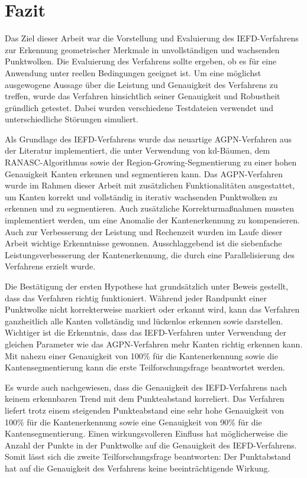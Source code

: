 \chapter{Fazit}

Das Ziel dieser Arbeit war die Vorstellung und Evaluierung des IEFD-Verfahrens zur Erkennung geometrischer Merkmale in unvollständigen und wachsenden Punktwolken. Die Evaluierung des Verfahrens sollte ergeben, ob es für eine Anwendung unter reellen Bedingungen geeignet ist. Um eine möglichst ausgewogene Aussage über die Leistung und Genauigkeit des Verfahrens zu treffen, wurde das Verfahren hinsichtlich seiner Genauigkeit und Robustheit gründlich getestet. Dabei wurden verschiedene Testdateien verwendet und unterschiedliche Störungen simuliert. 

Als Grundlage des IEFD-Verfahrens wurde das neuartige AGPN-Verfahren aus der Literatur implementiert, die unter Verwendung von kd-Bäumen, dem RANASC-Algorithmus sowie der Region-Growing-Segmentierung zu einer hohen Genauigkeit Kanten erkennen und segmentieren kann. Das AGPN-Verfahren wurde im Rahmen dieser Arbeit mit zusätzlichen Funktionalitäten ausgestattet, um Kanten korrekt und vollständig in iterativ wachsenden Punktwolken zu erkennen und zu segmentieren. Auch zusätzliche Korrekturmaßnahmen mussten implementiert werden, um eine Anomalie der Kantenerkennung zu kompensieren. Auch zur Verbesserung der Leistung und Rechenzeit wurden im Laufe dieser Arbeit wichtige Erkenntnisse gewonnen. Ausschlaggebend ist die siebenfache Leistungsverbesserung der Kantenerkennung, die durch eine Parallelisierung des Verfahrens erzielt wurde.

Die Bestätigung der ersten Hypothese hat grundsätzlich unter Beweis gestellt, dass das Verfahren richtig funktioniert. Während jeder Randpunkt einer Punktwolke nicht korrekterweise markiert oder erkannt wird, kann das Verfahren ganzheitlich alle Kanten vollständig und lückenlos erkennen sowie darstellen. Wichtiger ist die Erkenntnis, dass das IEFD-Verfahren unter Verwendung der gleichen Parameter wie das AGPN-Verfahren mehr Kanten richtig erkennen kann. Mit nahezu einer Genauigkeit von 100\% für die Kantenerkennung sowie die Kantensegmentierung kann die erste Teilforschungsfrage beantwortet werden. 

Es wurde auch nachgewiesen, dass die Genauigkeit des IEFD-Verfahrens nach keinem erkennbaren Trend mit dem Punkteabstand korreliert. Das Verfahren liefert trotz einem steigenden Punkteabstand eine sehr hohe Genauigkeit von 100\% für die Kantenerkennung sowie eine Genauigkeit von 90\% für die Kantensegmentierung. Einen wirkungsvolleren Einfluss hat möglicherweise die Anzahl der Punkte in der Punktwolke auf die Genauigkeit des IEFD-Verfahrens. Somit lässt sich die zweite Teilforschungsfrage beantworten: Der Punktabstand hat auf die Genauigkeit des Verfahrens keine beeinträchtigende Wirkung. 

